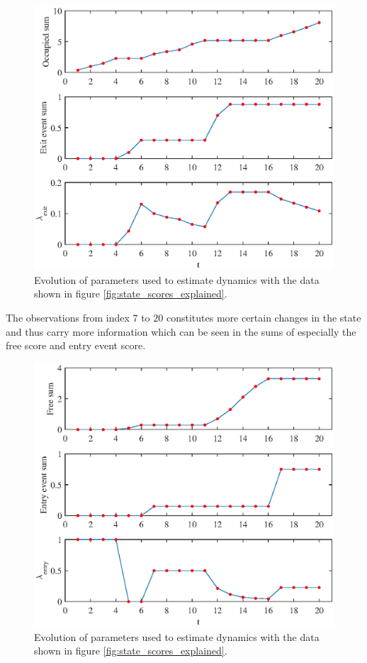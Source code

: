 \begin{figure}[htbp]
\centering
\includegraphics[scale=1]{chapters/mapping_of_dynamic_areas/figures/pmac_exit_explained}
\caption{Evolution of parameters used to estimate dynamics with the data shown in figure \ref{fig:state_scores_explained}.}
\label{fig:pmac_exit_explained}
\end{figure}

The observations from index $7$ to $20$ constitutes more certain changes in the state and thus carry more information which can be seen in the sums of especially the free score and entry event score. 

\begin{figure}[htbp]
    \centering
    \includegraphics[scale=1]{chapters/mapping_of_dynamic_areas/figures/pmac_entry_explained}
    \caption{Evolution of parameters used to estimate dynamics with the data shown in figure \ref{fig:state_scores_explained}.}
    \label{fig:pmac_entry_explained}
\end{figure}


